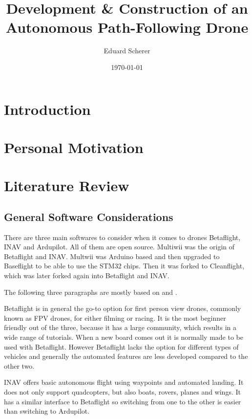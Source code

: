\documentclass{article}
\author{Eduard Scherer}
\title{Development \& Construction of an Autonomous Path-Following Drone}
\date{\today}
\newcommand{\comment}[1]{}
\begin{document}
\maketitle
\tableofcontents
\pagebreak
	\section{Introduction}

	\section{Personal Motivation}
	\comment{rather short}
	\section{Literature Review}
	\subsection{General Software Considerations}
	
	There are three main softwares to consider when it comes to drones Betaflight, INAV and Ardupilot. All of them are open source. Multiwii was the origin of Betaflight and INAV. Multwii was Arduino based and then upgraded to Baseflight to be able to use the STM32 chips. Then it was forked to Cleanflight, which was later forked again into Betaflight and INAV\cite{history}. 
	
	The following three paragraphs are mostly based on \cite{firmwarearticle} and \cite{firmwarevideo}.
	
	Betaflight is in general the go-to option for first person view drones, commonly known as FPV drones, for either filming or racing. It is the most beginner friendly out of the three, because it has a large community, which results in a wide range of tutorials. When a new board comes out it is normally made to be used with Betaflight. However Betaflight lacks the option for different types of vehicles and generally the automated features are less developed compared to the other two. 
	
	INAV offers basic autonomous flight using waypoints and automated landing. It does not only support quadcopters, but also boats, rovers, planes and wings. It has a similar interface to Betaflight so switching from one to the other is easier than switching to Ardupilot.
	
\end{document}
